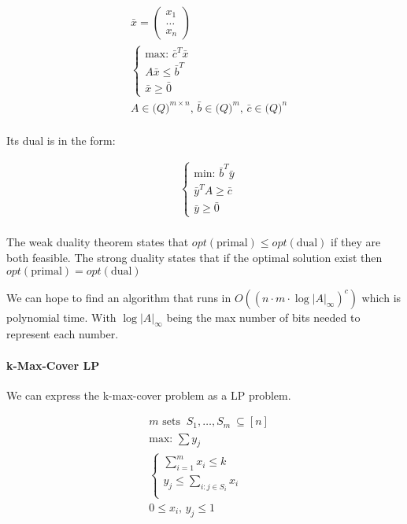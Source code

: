 \documentclass[]{article}
\begin{document}
\begin{align*}
	&\bar{x} = \begin{pmatrix}
	x_1\\
	\dots \\
	x_n
	\end{pmatrix}\\
	&\begin{cases}
	\text{max: } \bar{c}^T \bar{x}\\
	A \bar{x} \leq \bar{b}^T\\
	\bar{x} \geq \bar{0}
	\end{cases}\\
	&A \in \mathscr(Q)^{m\times n},\, \bar{b} \in \mathscr(Q)^{m},\, \bar{c} \in \mathscr(Q)^{n}\\
\end{align*}

Its dual is in the form:

\begin{align*}
&\begin{cases}
\text{min: } \bar{b}^T \bar{y}\\
\bar{y}^T A \geq \bar{c}\\
\bar{y} \geq \bar{0}
\end{cases}\\
\end{align*}

The weak duality theorem states that $opt(\text{primal}) \leq opt(\text{dual})$ if they are both feasible. The strong duality states that if the optimal solution exist then $opt(\text{primal}) = opt(\text{dual})$

We can hope to find an algorithm that runs in $O\left(\left(n\cdot m \cdot \log |A|_\infty \right)^c\right)$ which is polynomial time. With $\log |A|_\infty $ being the max number of bits needed to represent each number.

\paragraph{k-Max-Cover LP}
We can express the k-max-cover problem as a LP problem. 

\begin{align*}
&m \text{ sets }\ S_1,\dots,S_m\ \subseteq [n]\\
&\text{max: } \sum y_j\\
&\begin{cases}
\sum_{i=1}^{m} x_i \leq k\\
y_j \leq \sum_{i: j\in S_i}^{} x_i \\
\end{cases}\\
&0 \leq x_i,\, y_j \leq 1
\end{align*}
\end{document}
